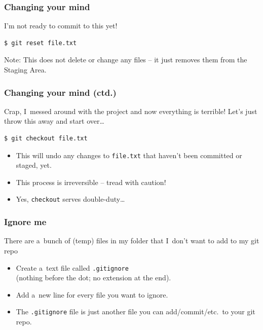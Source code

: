 \documentclass[12pt]{beamer}
\begin{document}
\begin{frame}[fragile]
  \frametitle{Changing your mind}

  \begin{block}{I'm not ready to commit to this yet!}
    {\footnotesize{}%
      \begin{verbatim}
$ git reset file.txt
      \end{verbatim}%
    }
    Note: This does \alert{not delete or change} any files -- it just removes
    them from the Staging Area.
  \end{block}
\end{frame}

\begin{frame}[fragile]
  \frametitle{Changing your mind (ctd.)}

  \begin{block}%
    {%
      Crap, I~messed around with the project and now everything is terrible!
      Let's just throw this away and start over\dots{}%
    }
    {\footnotesize{}%
      \begin{verbatim}
$ git checkout file.txt
      \end{verbatim}%
    }
    \begin{itemize}
      \item This will undo any changes to \texttt{file.txt} that haven't been
        \alert{committed or staged}, yet.
      \item This process is \alert{irreversible} -- tread with caution!
      \item Yes, \texttt{checkout} serves double-duty\dots{}
    \end{itemize}
  \end{block}
\end{frame}

\begin{frame}[fragile]
  \frametitle{Ignore me}

  \begin{block}
    {%
      There are a~bunch of (temp) files in my folder that I~don't want to add to
      my git repo%
    }
    \begin{itemize}
      \item Create a~text file called \texttt{.gitignore}\\%
        (nothing before the dot; no extension at the end).
      \item Add a~new line for every file you want to ignore.
      \item The \texttt{.gitignore} file is just another file you can
        add/\hspace{0}commit/\hspace{0}etc.\ to your git repo.
    \end{itemize}
  \end{block}
\end{frame}
\end{document}

